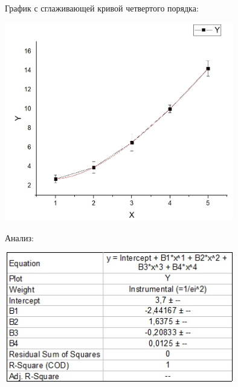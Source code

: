 \documentclass[12pt,a5paper,fleqn]{article}
\begin{document}
\newpage

График с сглаживающей кривой четвертого порядка:
\begin{center}
\includegraphics[width=10cm]{3}
\end{center}

Анализ:
\begin{center}
\includegraphics[width=10cm]{6}
\end{center}
\end{document}
